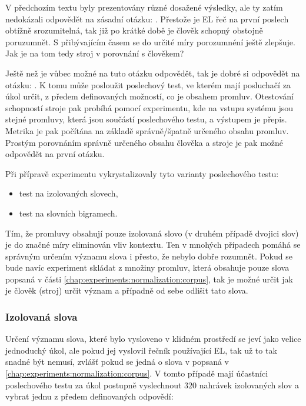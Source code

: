 V předchozím textu byly prezentovány různé dosažené výsledky, ale ty zatím nedokázali odpovědět na zásadní otázku: . Přestože je EL řeč na první poslech obtížně srozumitelná, tak již po krátké době je člověk schopný obstojně poruzumnět. S přibývajícím časem se do určité míry porozumnéní ještě zlepšuje. Jak je na tom tedy stroj v porovnání s člověkem?

Ještě než je vůbec možné na tuto otázku odpovědět, tak je dobré si odpovědět na otázku: . K tomu může posloužit poslechový test, ve kterém mají posluchačí za úkol určit, z předem definovaných možností, co je obsahem promluv. Otestování schopností stroje pak probíhá pomocí experimentu, kde na vstupu systému jsou stejné promluvy, která jsou součástí poslechového testu, a výstupem je přepis. Metrika je pak počítána na základě správně/špatně určeného obsahu promluv. Prostým porovnáním správně určeného obsahu člověka a stroje je pak možné odpovědět na první  otázku.

Při přípravě experimentu vykrystalizovaly tyto varianty poslechového testu:

\begin{itemize}
  \item test na izolovaných slovech,
  \item test na slovních bigramech.
\end{itemize}

\noindent Tím, že promluvy obsahují pouze izolovaná slovo (v druhém případě dvojici slov) je do značné míry eliminován vliv kontextu. Ten v mnohých případech pomáhá se správným určením významu slova i přesto, že nebylo dobře rozumnět. Pokud se bude navíc experiment skládat z množiny promluv, která obsahuje pouze slova popsaná v části \ref{chap:experiments:normalization:corpus}, tak je možné  určit jak  je člověk (stroj) určit význam a případně od sebe odlišit tato slova.

\subsubsection{Izolovaná slova}

Určení významu slova, které bylo vysloveno v klidném prostředí se jeví jako velice jednoduchý úkol, ale pokud jej vyslovil řečník používající EL, tak už to tak snadné být nemusí, zvlášť pokud se jedná o slova v popsaná v \ref{chap:experiments:normalization:corpus}. V tomto případě mají účastníci poslechového testu za úkol postupně vyslechnout $320$ nahrávek izolovaných slov a vybrat jednu z předem definovaných odpovědí:

